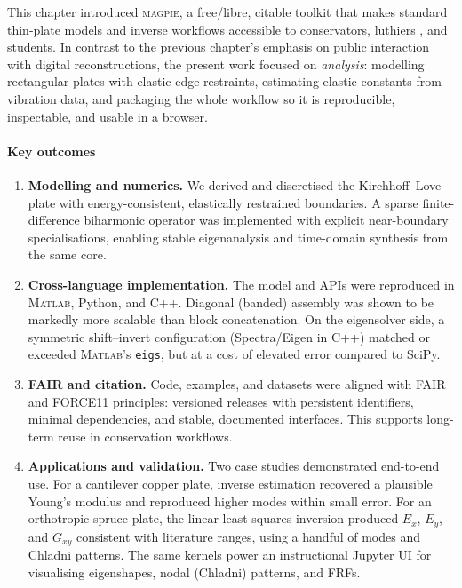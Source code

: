 This chapter introduced \textsc{magpie}, a free/libre, citable toolkit that makes standard thin-plate models and inverse workflows accessible to conservators, luthiers \nocite{ed_pasqua_2006}, and students. In contrast to the previous chapter’s emphasis on public interaction with digital reconstructions, the present work focused on \emph{analysis}: modelling rectangular plates with elastic edge restraints, estimating elastic constants from vibration data, and packaging the whole workflow so it is reproducible, inspectable, and usable in a browser.

\paragraph{Key outcomes}
\begin{enumerate}
  \item \textbf{Modelling and numerics.} We derived and discretised the Kirchhoff–Love plate with energy-consistent, elastically restrained boundaries. A sparse finite-difference biharmonic operator was implemented with explicit near-boundary specialisations, enabling stable eigenanalysis and time-domain synthesis from the same core.
  \item \textbf{Cross-language implementation.} The model and APIs were reproduced in M\textsc{atlab}, Python, and C\textsc{++}. Diagonal (banded) assembly was shown to be markedly more scalable than block concatenation. On the eigensolver side, a symmetric shift–invert configuration (Spectra/Eigen in C\textsc{++}) matched or exceeded M\textsc{atlab}’s \texttt{eigs}, but at a cost of elevated error compared to SciPy.
  \item \textbf{FAIR and citation.} Code, examples, and datasets were aligned with FAIR and FORCE11 principles: versioned releases with persistent identifiers, minimal dependencies, and stable, documented interfaces. This supports long-term reuse in conservation workflows.
  \item \textbf{Applications and validation.} Two case studies demonstrated end-to-end use. For a cantilever copper plate, inverse estimation recovered a plausible Young’s modulus and reproduced higher modes within small error. For an orthotropic spruce plate, the linear least-squares inversion produced $E_x$, $E_y$, and $G_{xy}$ consistent with literature ranges, using a handful of modes and Chladni patterns. The same kernels power an instructional Jupyter UI for visualising eigenshapes, nodal (Chladni) patterns, and FRFs.
\end{enumerate}

